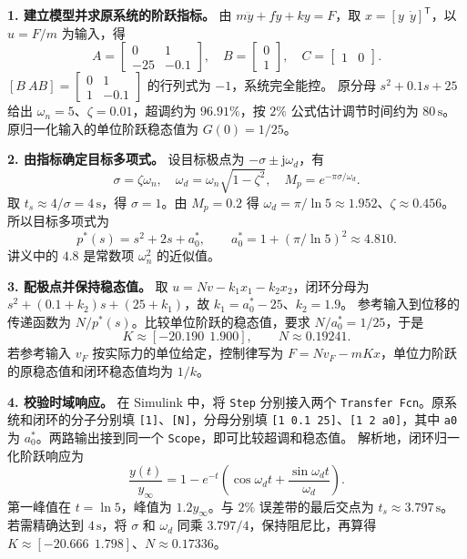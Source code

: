 
\sol \textbf{1. 建立模型并求原系统的阶跃指标。}
由 $m\ddot y+f\dot y+ky=F$，取 $x=[y\ \ \dot y]^{\mathsf T}$，以 $u=F/m$ 为输入，得
\[
    A=\begin{bmatrix}0&1\\-25&-0.1\end{bmatrix},\quad
    B=\begin{bmatrix}0\\1\end{bmatrix},\quad C=\begin{bmatrix}1&0\end{bmatrix}.
\]
$[B\ AB]=\begin{bmatrix}0&1\\1&-0.1\end{bmatrix}$ 的行列式为 $-1$，系统完全能控。
原分母 $s^2+0.1s+25$ 给出 $\omega_n=5$、$\zeta=0.01$，超调约为 $96.91\%$，按 $2\%$ 公式估计调节时间约为 $80\,\mathrm{s}$。原归一化输入的单位阶跃稳态值为 $G(0)=1/25$。

\textbf{2. 由指标确定目标多项式。}
设目标极点为 $-\sigma\pm\mathrm j\omega_d$，有
\[
    \sigma=\zeta\omega_n,\quad
    \omega_d=\omega_n\sqrt{1-\zeta^2},\quad
    M_p=e^{-\pi\sigma/\omega_d}.
\]
取 $t_s\approx 4/\sigma=4\,\mathrm{s}$，得 $\sigma=1$。由 $M_p=0.2$ 得 $\omega_d=\pi/\ln 5\approx1.952$、$\zeta\approx0.456$。所以目标多项式为
\[
    p^\ast(s)=s^2+2s+a_0^\ast,\qquad
    a_0^\ast=1+(\pi/\ln 5)^2\approx4.810 .
\]
讲义中的 $4.8$ 是常数项 $\omega_n^2$ 的近似值。

\textbf{3. 配极点并保持稳态值。}
取 $u=Nv-k_1x_1-k_2x_2$，闭环分母为 $s^2+(0.1+k_2)s+(25+k_1)$，故 $k_1=a_0^\ast-25$、$k_2=1.9$。
参考输入到位移的传递函数为 $N/p^\ast(s)$。比较单位阶跃的稳态值，要求 $N/a_0^\ast=1/25$，于是
\[
    \boxed{K\approx[-20.190\ \ 1.900],\qquad N\approx0.19241}.
\]
若参考输入 $v_F$ 按实际力的单位给定，控制律写为 $F=Nv_F-mKx$，单位力阶跃的原稳态值和闭环稳态值均为 $1/k$。

\textbf{4. 校验时域响应。}
在 Simulink 中，将 \texttt{Step} 分别接入两个 \texttt{Transfer Fcn}。原系统和闭环的分子分别填 \texttt{[1]}、\texttt{[N]}，分母分别填 \texttt{[1 0.1 25]}、\texttt{[1 2 a0]}，其中 \texttt{a0} 为 $a_0^\ast$。两路输出接到同一个 \texttt{Scope}，即可比较超调和稳态值。
解析地，闭环归一化阶跃响应为
\[
    \frac{y(t)}{y_\infty}
      =1-e^{-t}\left(\cos\omega_dt+\frac{\sin\omega_dt}{\omega_d}\right).
\]
第一峰值在 $t=\ln 5$，峰值为 $1.2y_\infty$。与 $2\%$ 误差带的最后交点为 $t_s\approx3.797\,\mathrm{s}$。若需精确达到 $4\,\mathrm{s}$，将 $\sigma$ 和 $\omega_d$ 同乘 $3.797/4$，保持阻尼比，再算得 $K\approx[-20.666\ \ 1.798]$、$N\approx0.17336$。

